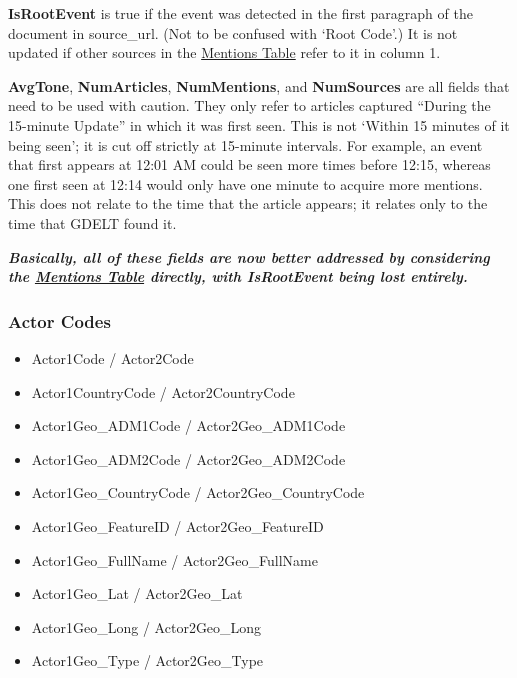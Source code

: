 \par \textbf{IsRootEvent} is true if the event was detected in the first paragraph of the document in source\_url. (Not to be confused with ‘Root Code’.) It is not updated if other sources in the \hyperlink{section.4.2}{Mentions Table} refer to it in column 1. %
 
\par \textbf{AvgTone}, \textbf{NumArticles}, \textbf{NumMentions}, and \textbf{NumSources} are all fields that need to be used with caution. 
 They only refer to articles captured “During the 15-minute Update” in which it was first seen. 
 This is not ‘Within 15 minutes of it being seen’; it is cut off strictly at 15-minute intervals. %
 For example, an event that first appears at 12:01 AM could be seen more times before 12:15, whereas one first seen at 12:14 would only have one minute to acquire more mentions. 
 This does not relate to the time that the article appears; it relates only to the time that GDELT found it.

\textbf{\textit{Basically, all of these fields are now better addressed by considering the \hyperlink{section.4.2}{Mentions Table} directly, with IsRootEvent being lost entirely.}} %

\subsubsection{Actor Codes}%
\begin{itemize} \item Actor1Code / Actor2Code
\item Actor1CountryCode / Actor2CountryCode
\item Actor1Geo\_ADM1Code / Actor2Geo\_ADM1Code
\item  Actor1Geo\_ADM2Code / Actor2Geo\_ADM2Code
\item Actor1Geo\_CountryCode / Actor2Geo\_CountryCode
\item Actor1Geo\_FeatureID / Actor2Geo\_FeatureID
\item Actor1Geo\_FullName / Actor2Geo\_FullName
\item Actor1Geo\_Lat / Actor2Geo\_Lat
\item Actor1Geo\_Long / Actor2Geo\_Long
\item Actor1Geo\_Type / Actor2Geo\_Type \end{itemize}

